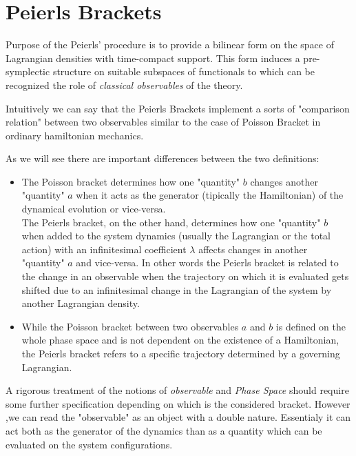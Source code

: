 \documentclass[Main]{subfiles}
\begin{document}
	\section{Peierls Brackets}
		Purpose of the Peierls' procedure is to provide a bilinear form on the space of Lagrangian densities with time-compact support.
		This form induces a pre-symplectic structure on suitable subspaces of functionals to which can be recognized the role of \emph{classical observables}  of the theory.	
	
	\begin{observation}
		Intuitively we can say that the Peierls Brackets implement a sorts of "comparison relation" between two observables similar to the case of Poisson Bracket in ordinary hamiltonian mechanics.
		
		As we will see there are important differences between the two definitions:
		\begin{itemize}
			\item The Poisson bracket determines how one "quantity" $b$ changes another "quantity" $a$ when it acts as the  generator (tipically the  Hamiltonian) of the dynamical evolution or vice-versa. \cite{Sharan2010}
	\\	
	The Peierls bracket, on the other hand, determines how one "quantity" $b$  when added to the system dynamics (usually the Lagrangian or the total action)  with an infinitesimal coefficient $\lambda$ affects changes in another "quantity" $a$ and vice-versa.
	In other words the Peierls bracket is related to the change in an observable when the trajectory on which it is evaluated gets shifted due to an infinitesimal change in the Lagrangian of the system by another Lagrangian density.
	
			\item While the Poisson bracket between two observables $a$ and $b$ is defined on the whole phase space and is not dependent on the existence of a Hamiltonian, the Peierls bracket refers to a specific trajectory determined by a governing Lagrangian. 
		\end{itemize}
		A rigorous treatment of the notions of \emph{observable} and \emph{Phase Space} should require some further specification depending on which is the  considered bracket.		
		However ,we can read the "observable" as an object with a double nature. Essentialy it can act both as the generator of the dynamics than as a quantity which can be evaluated on the system configurations.
	\end{observation}	
	
\end{document}
